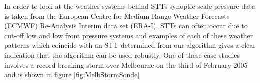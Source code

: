 In order to look at the weather systems behind STTs synoptic scale pressure data is taken from the European Centre for Medium-Range Weather Forecasts (ECMWF) Re-Analysis Interim data set (ERA-I).
STTs can often occur due to cut-off low and low front pressure systems and examples of each of these weather patterns which coincide with an STT determined from our algorithm gives a clear indication that the algorithm can be used robustly.
One of these case studies involves a record breaking storm over Melbourne on the third of February 2005 and is shown in figure \ref{fig:MelbStormSonde}

